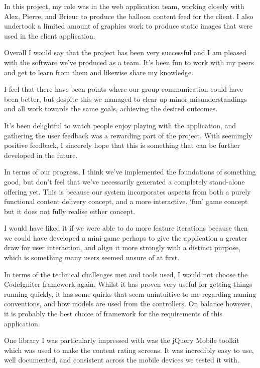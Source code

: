 In this project, my role was in the web application team, working closely with Alex, Pierre, and Brieuc to produce the balloon content feed for the client. I also undertook a limited amount of graphics work to produce static images that were used in the client application.

Overall I would say that the project has been very successful and I am pleased with the software we've produced as a team. It's been fun to work with my peers and get to learn from them and likewise share my knowledge.

I feel that there have been points where our group communication could have been better, but despite this we managed to clear up minor misunderstandings and all work towards the same goals, achieving the desired outcomes.

It's been delightful to watch people enjoy playing with the application, and gathering the user feedback was a rewarding part of the project. With seemingly positive feedback, I sincerely hope that this is something that can be further developed in the future.

In terms of our progress, I think we've implemented the foundations of something good, but don't feel that we've necessarily generated a completely stand-alone offering yet. This is because our system incorporates aspects from both a purely functional content delivery concept, and a more interactive, `fun' game concept but it does not fully realise either concept.

I would have liked it if we were able to do more feature iterations because then we could have developed a mini-game perhaps to give the application a greater draw for user interaction, and align it more strongly with a distinct purpose, which is something many users seemed unsure of at first.

In terms of the technical challenges met and tools used, I would not choose the CodeIgniter framework again. Whilst it has proven very useful for getting things running quickly, it has some quirks that seem unintuitive to me regarding naming conventions, and how models are used from the controllers. On balance however, it is probably the best choice of framework for the requirements of this application.

One library I was particularly impressed with was the jQuery Mobile toolkit which was used to make the content rating screens. It was incredibly easy to use, well documented, and consistent across the mobile devices we tested it with.

